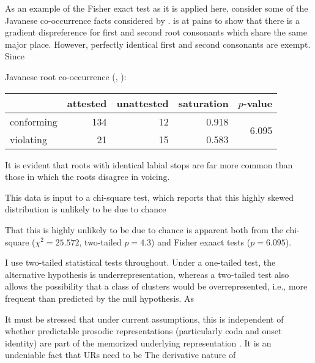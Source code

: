 As an example of the Fisher exact test as it is applied here, consider some of the Javanese co-occurrence facts considered by \citet{Mester1988}. \citeauthor{Mester1988} is at pains to show that there is a gradient dispreference for first and second root consonants which share the same major place. However, perfectly identical first and second consonants are exempt. Since 



\begin{example}
Javanese root co-occurrence (\citealp[][264]{Uhlenbeck1950}, \citealp[][139]{Mester1988}): 

\vspace{0.5\baselineskip}
\begin{tabular}{l r r r r}
\toprule
           & attested & unattested & saturation & $p$-value \\
\midrule
conforming & 134      & 12         & 0.918      & \multirow{2}{*}{6.095\e{-06}} \\
violating  & 21       & 15         & 0.583 \\
\bottomrule
\end{tabular}
\end{example}

\noindent
It is evident that roots with identical labial stops are far more common than those in which the roots disagree in voicing. 

This data is input to a chi-square test, which reports that this highly skewed distribution is unlikely to be due to chance 

That this is highly unlikely to be due to chance is apparent both from the chi-square ($\chi^2 = 25.572$, two-tailed $p = 4.3$) and Fisher exaact tests ($p =  6.095$). 

I use two-tailed statistical tests throughout. 
Under a one-tailed test, the alternative hypothesis is underrepresentation, whereas a two-tailed test also allows the possibility that a class of clusters would be overrepresented, i.e., more frequent than predicted by the null hypothesis. As 

\citet{Pierrehumbert1994}

It must be stressed that under current assumptions, this is independent of whether predictable prosodic representations (particularly coda and onset identity) are part of the memorized underlying representation \citep[e.g.,][]{Vaux2003}.
It is an undeniable fact that URs need to be 
The derivative nature of 
\citet{Ito1989a,Noske1992}

